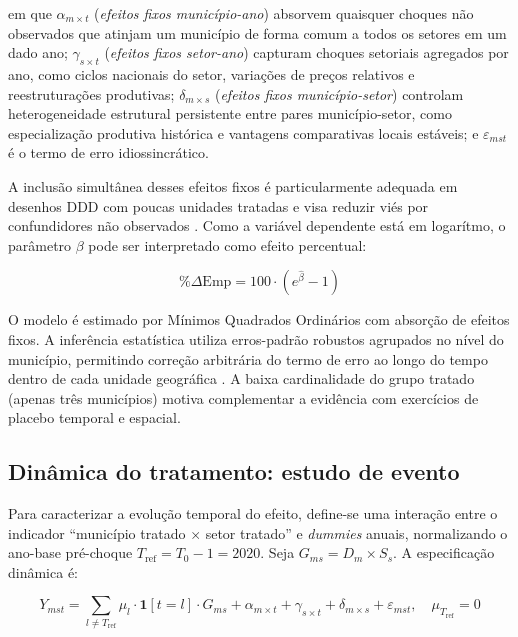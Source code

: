 \documentclass[12pt,a4paper]{article}
\begin{document}
\noindent em que $\alpha_{m \times t}$ (\textit{efeitos fixos munic\'ipio-ano}) absorvem quaisquer choques n\~ao observados que atinjam um munic\'ipio de forma comum a todos os setores em um dado ano; $\gamma_{s \times t}$ (\textit{efeitos fixos setor-ano}) capturam choques setoriais agregados por ano, como ciclos nacionais do setor, varia\c{c}\~oes de pre\c{c}os relativos e reestrutura\c{c}\~oes produtivas; $\delta_{m \times s}$ (\textit{efeitos fixos munic\'ipio-setor}) controlam heterogeneidade estrutural persistente entre pares munic\'ipio-setor, como especializa\c{c}\~ao produtiva hist\'orica e vantagens comparativas locais est\'aveis; e $\varepsilon_{mst}$ \'e o termo de erro idiossincr\'atico.

A inclus\~ao simult\^anea desses efeitos fixos \'e particularmente adequada em desenhos DDD com poucas unidades tratadas e visa reduzir vi\'es por confundidores n\~ao observados \parencite{angrist2009,wooldridge2010}. Como a vari\'avel dependente est\'a em logar\'itmo, o par\^ametro $\beta$ pode ser interpretado como efeito percentual:

\begin{equation}
\%\Delta\text{Emp} = 100 \cdot (e^{\hat{\beta}} - 1)
\label{eq:perc}
\end{equation}

O modelo \'e estimado por M\'inimos Quadrados Ordin\'arios com absor\c{c}\~ao de efeitos fixos. A infer\^encia estat\'istica utiliza erros-padr\~ao robustos agrupados no n\'ivel do munic\'ipio, permitindo corre\c{c}\~ao arbitr\'aria do termo de erro ao longo do tempo dentro de cada unidade geogr\'afica \parencite{bertrand2004,cameron2015}. A baixa cardinalidade do grupo tratado (apenas tr\^es munic\'ipios) motiva complementar a evid\^encia com exerc\'icios de placebo temporal e espacial.

\subsection{Din\^amica do tratamento: estudo de evento}
\label{sub:eventstudy}

Para caracterizar a evolu\c{c}\~ao temporal do efeito, define-se uma intera\c{c}\~ao entre o indicador ``munic\'ipio tratado $\times$ setor tratado'' e \textit{dummies} anuais, normalizando o ano-base pr\'e-choque $T_{\text{ref}} = T_0 - 1 = 2020$. Seja $G_{ms} = D_m \times S_s$. A especifica\c{c}\~ao din\^amica \'e:

\begin{equation}
Y_{mst} = \sum_{l \neq T_{\text{ref}}} \mu_l \cdot \mathbf{1}[t = l] \cdot G_{ms}
  + \alpha_{m \times t} + \gamma_{s \times t} + \delta_{m \times s} + \varepsilon_{mst},
  \quad \mu_{T_{\text{ref}}} = 0
\label{eq:eventstudy}
\end{equation}
\end{document}
